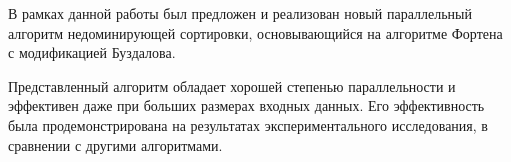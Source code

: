 \startconclusionpage
В рамках данной работы был предложен и реализован новый параллельный алгоритм недоминирующей сортировки, основывающийся на алгоритме Фортена с модификацией Буздалова.

Представленный алгоритм обладает хорошей степенью параллельности и эффективен даже при больших размерах входных данных.
Его эффективность была продемонстрирована на результатах экспериментального исследования, в сравнении с другими алгоритмами.
